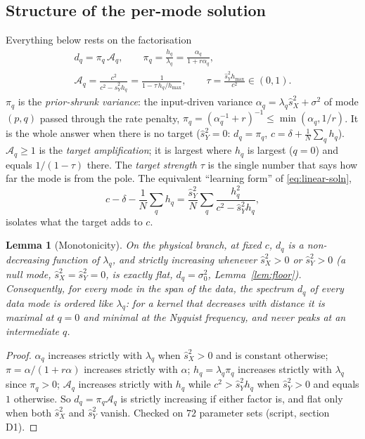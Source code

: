 \documentclass[11pt,a4paper]{article}
\newcommand{\sX}{\hat s_X^2}
\newcommand{\sY}{\hat s_Y^2}
\newcommand{\amp}{\mathcal A}
\newtheorem{lemma}{Lemma}
\theoremstyle{remark}
\begin{document}
\subsection{Structure of the per-mode solution}
\label{sec:structure}

Everything below rests on the factorisation
\begin{equation}
\begin{gathered}
  d_q = \pi_q\,\amp_q,
  \qquad
  \pi_q = \frac{h_q}{\lambda_q} = \frac{\alpha_q}{1 + r\alpha_q},\\
  \amp_q = \frac{c^2}{c^2 - \sY h_q} = \frac{1}{1 - \tau\,h_q/h_{\max}},
  \qquad
  \tau = \frac{\sY h_{\max}}{c^2}\in(0,1).
\end{gathered}
  \label{eq:factor}
\end{equation}
$\pi_q$ is the \emph{prior-shrunk variance}: the input-driven variance $\alpha_q = \lambda_q\sX + \sigma^2$ of mode $(p,q)$ passed through the rate penalty, $\pi_q = (\alpha_q^{-1} + r)^{-1} \le \min(\alpha_q, 1/r)$. It is the whole answer when there is no target ($\sY = 0$: $d_q = \pi_q$, $c = \delta + \frac1N\sum_q h_q$).
$\amp_q \ge 1$ is the \emph{target amplification}; it is largest where $h_q$ is largest ($q = 0$) and equals $1/(1-\tau)$ there. The \emph{target strength} $\tau$ is the single number that says how far the mode is from the pole. The equivalent ``learning form'' of \eqref{eq:linear-soln},
\begin{equation}
  c - \delta - \frac1N\sum_q h_q = \frac{\sY}{N}\sum_q\frac{h_q^2}{c^2 - \sY h_q},
  \label{eq:learning-form}
\end{equation}
isolates what the target adds to $c$.

\begin{lemma}[Monotonicity]\label{lem:mono}
On the physical branch, at fixed $c$, $d_q$ is a non-decreasing function of $\lambda_q$, and strictly increasing whenever $\sX > 0$ or $\sY > 0$ (a null mode, $\sX = \sY = 0$, is exactly flat, $d_q = \sigma_0^2$, Lemma~\ref{lem:floor}). Consequently, for every mode in the span of the data, the spectrum $d_q$ of every data mode is ordered like $\lambda_q$: for a kernel that decreases with distance it is maximal at $q = 0$ and minimal at the Nyquist frequency, and never peaks at an intermediate $q$.
\end{lemma}
\begin{proof}
$\alpha_q$ increases strictly with $\lambda_q$ when $\sX > 0$ and is constant otherwise; $\pi = \alpha/(1+r\alpha)$ increases strictly with $\alpha$; $h_q = \lambda_q\pi_q$ increases strictly with $\lambda_q$ since $\pi_q > 0$; $\amp_q$ increases strictly with $h_q$ while $c^2 > \sY h_q$ when $\sY > 0$ and equals $1$ otherwise. So $d_q = \pi_q\amp_q$ is strictly increasing if either factor is, and flat only when both $\sX$ and $\sY$ vanish. Checked on $72$ parameter sets (script, section D1).
\end{proof}
\end{document}
